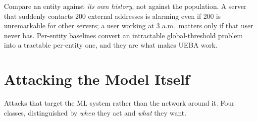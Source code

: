 \begin{conceptbox}
Compare an entity against \emph{its own history}, not against the population. A
server that suddenly contacts 200 external addresses is alarming even if 200 is
unremarkable for other servers; a user working at 3 a.m.\ matters only if that user
never has. Per-entity baselines convert an intractable global-threshold problem
into a tractable per-entity one, and they are what makes UEBA work.
\end{conceptbox}

\section{Attacking the Model Itself}

\begin{definitionbox}
Attacks that target the ML system rather than the network around it. Four classes,
distinguished by \emph{when} they act and \emph{what} they want.
\end{definitionbox}

